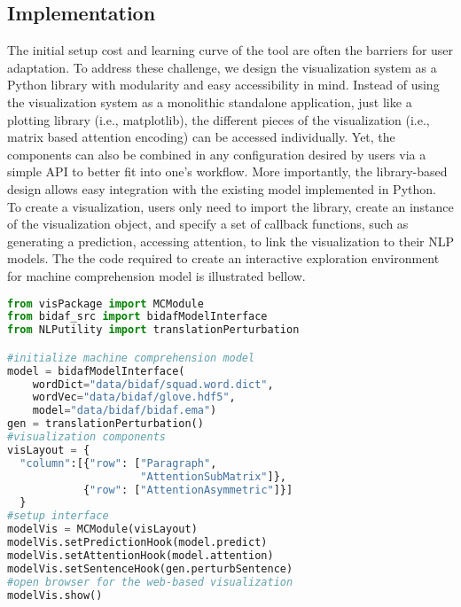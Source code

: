\subsection{Implementation}
The initial setup cost and learning curve of the tool are often the barriers for user adaptation. To address these challenge, we design the visualization system as a Python library with modularity and easy accessibility in mind.
Instead of using the visualization system as a monolithic standalone application, just like a plotting library (i.e., matplotlib), the different pieces of the visualization (i.e., matrix based attention encoding) can be accessed individually.
% 
Yet, the components can also be combined in any configuration desired by users via a simple API to better fit into one's workflow.
More importantly, the library-based design allows easy integration with the existing model implemented in Python.
%
To create a visualization, users only need to import the library, create an instance of the visualization object, and specify a set of callback functions, such as generating a prediction, accessing attention, to link the visualization to their NLP models. The the code required to create an interactive exploration environment for machine comprehension model is illustrated bellow.

\begin{lstlisting}[language=Python, caption=Code for setting up the visualization system shown in Figure~\ref{fig:MCexample}(a).]
from visPackage import MCModule
from bidaf_src import bidafModelInterface
from NLPutility import translationPerturbation

#initialize machine comprehension model
model = bidafModelInterface(
    wordDict="data/bidaf/squad.word.dict",
    wordVec="data/bidaf/glove.hdf5",
    model="data/bidaf/bidaf.ema")
gen = translationPerturbation()
#visualization components
visLayout = {
  "column":[{"row": ["Paragraph", 
                     "AttentionSubMatrix"]},
            {"row": ["AttentionAsymmetric"]}]
  }
#setup interface
modelVis = MCModule(visLayout)
modelVis.setPredictionHook(model.predict)
modelVis.setAttentionHook(model.attention)
modelVis.setSentenceHook(gen.perturbSentence)
#open browser for the web-based visualization
modelVis.show()
\end{lstlisting}




